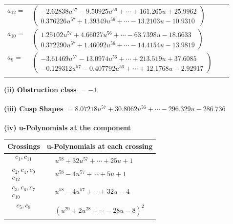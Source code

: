 \documentclass[1p]{elsarticle_modified}
\theoremstyle{definition}
\begin{document}
\begin{tabular}{m{7pt} m{180pt} m{7pt} m{180pt} }
\flushright $a_{12}=$&$\begin{pmatrix}-2.62838 u^{57}-9.50925 u^{56}+\cdots+161.265 u+25.9962\\0.376226 u^{57}+1.39349 u^{56}+\cdots-13.2103 u-10.9310\end{pmatrix}$ \\
\flushright $a_{10}=$&$\begin{pmatrix}1.25102 u^{57}+4.66027 u^{56}+\cdots-63.7398 u-18.6633\\0.372290 u^{57}+1.46092 u^{56}+\cdots-14.4154 u-13.9819\end{pmatrix}$ \\
\flushright $a_{9}=$&$\begin{pmatrix}-3.61469 u^{57}-13.0974 u^{56}+\cdots+213.519 u+37.6085\\-0.129312 u^{57}-0.407792 u^{56}+\cdots+12.1768 u-2.92917\end{pmatrix}$\\&\end{tabular}
\flushleft \textbf{(ii) Obstruction class $= -1$}\\~\\
\flushleft \textbf{(iii) Cusp Shapes $= 8.07218 u^{57}+30.8062 u^{56}+\cdots-296.329 u-286.736$}\\~\\
\newpage\renewcommand{\arraystretch}{1}
\flushleft \textbf{(iv) u-Polynomials at the component}\newline \\
\begin{tabular}{m{50pt}|m{274pt}}
Crossings & \hspace{64pt}u-Polynomials at each crossing \\
\hline $$\begin{aligned}c_{1},c_{11}\end{aligned}$$&$\begin{aligned}
&u^{58}+32 u^{57}+\cdots+25 u+1
\end{aligned}$\\
\hline $$\begin{aligned}c_{2},c_{4},c_{9}\\c_{12}\end{aligned}$$&$\begin{aligned}
&u^{58}-4 u^{57}+\cdots+5 u+1
\end{aligned}$\\
\hline $$\begin{aligned}c_{3},c_{6},c_{7}\\c_{10}\end{aligned}$$&$\begin{aligned}
&u^{58}-4 u^{57}+\cdots+32 u-4
\end{aligned}$\\
\hline $$\begin{aligned}c_{5},c_{8}\end{aligned}$$&$\begin{aligned}
&(u^{29}+2 u^{28}+\cdots-28 u-8)^{2}
\end{aligned}$\\
\hline
\end{tabular}\\~\\
\end{document}
